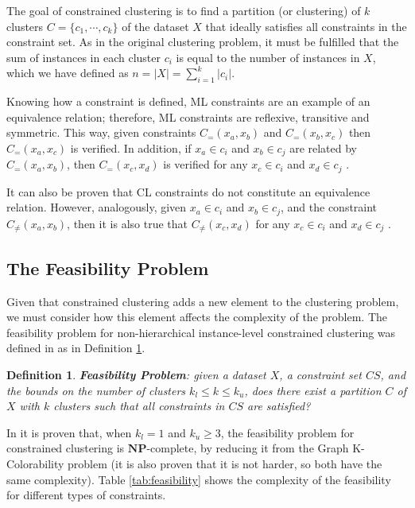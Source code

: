 \documentclass[review]{elsarticle}
\newtheorem{definition}{Definition}
\begin{document}
The goal of constrained clustering is to find a partition (or clustering) of $k$ clusters $C = \{c_1, \cdots, c_k\}$ of the dataset $X$ that ideally satisfies all constraints in the constraint set. As in the original clustering problem, it must be fulfilled that the sum of instances in each cluster $c_i$ is equal to the number of instances in $X$, which we have defined as $n = |X| = \sum_{i = 1}^{k} |c_i|$.

Knowing how a constraint is defined, ML constraints are an example of an equivalence relation; therefore, ML constraints are reflexive, transitive and symmetric. This way, given constraints $C_=(x_a,x_b)$ and $C_=(x_b,x_c)$ then $C_=(x_a,x_c)$ is verified. In addition, if $x_a \in c_i$ and $x_b \in c_j$ are related by $C_=(x_a,x_b)$, then $C_=(x_c,x_d)$ is verified for any $x_c \in c_i$ and $x_d \in c_j$ \cite{davidson2007survey}.

It can also be proven that CL constraints do not constitute an equivalence relation. However, analogously, given $x_a \in c_i$ and $x_b \in c_j$, and the constraint $C_{\neq}(x_a,x_b)$, then it is also true that $C_{\neq}(x_c,x_d)$ for any $x_c \in c_i$ and $x_d \in c_j$ \cite{davidson2007survey}.

\subsection{The Feasibility Problem} \label{sec:BackFeas}

Given that constrained clustering adds a new element to the clustering problem, we must consider how this element affects the complexity of the problem. The feasibility problem for non-hierarchical instance-level constrained clustering was defined in \cite{davidson2005clustering} as in Definition \ref{def1}.

\begin{definition}

	\textbf{Feasibility Problem}: given a dataset $X$, a constraint set $CS$, and the bounds on the number of clusters $k_l \leq k \leq k_u$, does there exist a partition $C$ of $X$ with $k$ clusters such that all constraints in $CS$ are satisfied? \cite{davidson2005clustering}
	\label{def1}

\end{definition}

In \cite{davidson2005clustering} it is proven that, when $k_l = 1$ and $k_u \ge 3$, the feasibility problem for constrained clustering is $\mathbf{NP}$-complete, by reducing it from the Graph K-Colorability problem (it is also proven that it is not harder, so both have the same complexity). Table \ref{tab:feasibility} shows the complexity of the feasibility for different types of constraints.
\end{document}
